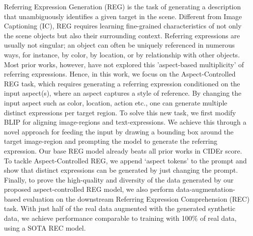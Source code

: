 Referring Expression Generation (REG) is the task of generating a description that unambiguously identifies a given target in the scene. Different from Image Captioning (IC), REG requires learning fine-grained characteristics of not only the scene objects but also their surrounding context. Referring expressions are usually not singular; an object can often be uniquely referenced in numerous ways, for instance, by color, by location, or by relationship with other objects. Most prior works, however, have not explored this 'aspect-based multiplicity' of referring expressions. Hence, in this work, we focus on the Aspect-Controlled REG task, which requires generating a referring expression conditioned on the input aspect(s), where an aspect captures a style of reference. By changing the input aspect such as color, location, action etc., one can generate multiple distinct expressions per target region. To solve this new task, we first modify BLIP for aligning image-regions and text-expressions. We achieve this through a novel approach for feeding the input by drawing a bounding box around the target image-region and prompting the model to generate the referring expression. Our base REG model already beats all prior works in CIDEr score. To tackle Aspect-Controlled REG, we append `aspect tokens' to the prompt and show that distinct expressions can be generated by just changing the prompt. Finally, to prove the high-quality and diversity of the data generated by our proposed aspect-controlled REG model, we also perform data-augmentation-based evaluation on the downstream Referring Expression Comprehension (REC) task. With just half of the real data augmented with the generated synthetic data, we achieve performance comparable to training with 100\% of real data, using a SOTA REC model.